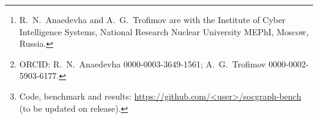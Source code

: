 \documentclass[journal]{IEEEtran}
\begin{document}
\title{\TitleText}

\author{Roger~Nick~Anaedevha and Alexander~G.~Trofimov%
\thanks{R.~N.~Anaedevha and A.~G.~Trofimov are with the Institute of Cyber Intelligence Systems, National
Research Nuclear University MEPhI, Moscow, Russia.}%
\thanks{ORCID: R.~N.~Anaedevha \mbox{0000-0003-3649-1561}; A.~G.~Trofimov \mbox{0000-0002-5903-6177}.}%
\thanks{Code, benchmark and results: \url{https://github.com/<user>/socgraph-bench} (to be updated on release).}}


\maketitle


\end{document}
